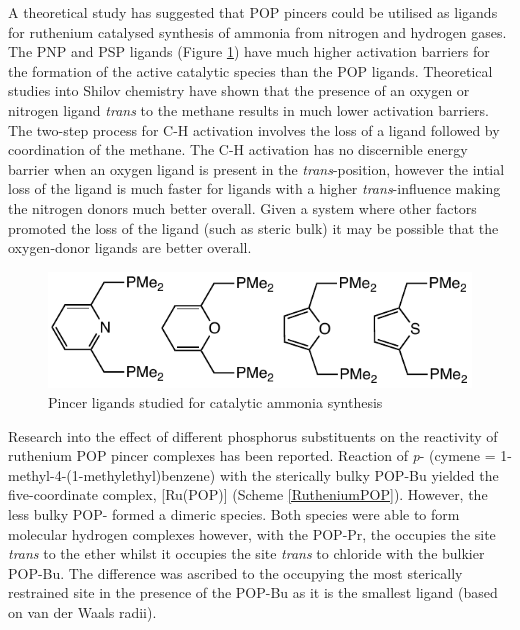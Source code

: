 A theoretical study has suggested that POP pincers could be utilised as ligands for ruthenium catalysed synthesis of ammonia from nitrogen and hydrogen gases.\cite{Holscher2007}  The PNP and PSP ligands (Figure \ref{Theoreticalammonia}) have much higher activation barriers for the formation of the active catalytic species than the POP ligands.  Theoretical studies into Shilov chemistry have shown that the presence of an oxygen or nitrogen ligand \emph{trans} to the methane results in much lower activation barriers.\cite{Zhu2009}  The two-step process for C-H activation involves the loss of a ligand followed by coordination of the methane.  The C-H activation has no discernible energy barrier when an oxygen ligand is present in the \emph{trans}-position, however the intial loss of the ligand is much faster for ligands with a higher \emph{trans}-influence making the nitrogen donors much better overall.  Given a system where other factors promoted the loss of the ligand (such as steric bulk) it may be possible that the oxygen-donor ligands are better overall.  

\begin{figure}[ht]
\centering
\includegraphics[]{../Figures/Theoreticalammonia.pdf}
\caption[Pincer ligands studied for catalytic ammonia synthesis]{Pincer ligands studied for catalytic ammonia synthesis}
\label{Theoreticalammonia}
\end{figure}

Research into the effect of different phosphorus substituents on the reactivity of ruthenium POP pincer complexes has been reported.\cite{Major2005}  Reaction of \ce{[RuCl2(}\emph{p}-\ce{cymene)]2} (\gls{cymene} = 1-methyl-4-(1-methylethyl)benzene) with the sterically bulky POP-Bu yielded the five-coordinate complex, [Ru(POP)] (Scheme \ref{RutheniumPOP}).  However, the less bulky POP- formed a dimeric species.  Both species were able to form molecular hydrogen complexes however, with the POP-Pr, the  occupies the site \emph{trans} to the ether whilst it occupies the site \emph{trans} to chloride with the bulkier POP-Bu.  The difference was ascribed to the  occupying the most sterically restrained site in the presence of the POP-Bu as it is the smallest ligand (based on van der Waals radii).  

